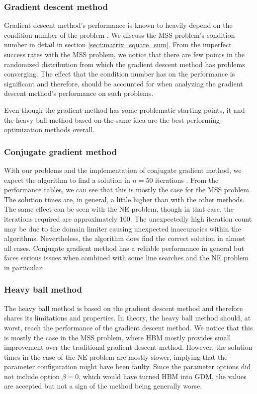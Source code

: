 \documentclass[english, 12pt, a4paper, sci, utf8, a-1b, online, table]{aaltothesis}
\begin{document}
\subsubsection*{Gradient descent method}

Gradient descent method's performance is known to heavily depend on the condition number of the problem \cite{book:introduction_continuous_optimization}. We discuss the MSS problem's condition number in detail in section \ref{sect:matrix_square_sum}. From the imperfect success rates with the MSS problem, we notice that there are few points in the randomized distribution from which the gradient descent method has problems converging. The effect that the condition number has on the performance is significant and therefore, should be accounted for when analyzing the gradient descent method's performance on such problems.

Even though the gradient method has some problematic starting points, it and the heavy ball method based on the same idea are the best performing optimization methods overall.

\subsubsection*{Conjugate gradient method}

With our problems and the implementation of conjugate gradient method, we expect the algorithm to find a solution in $n=50$ iterations \cite{book:introduction_continuous_optimization}. From the performance tables, we can see that this is mostly the case for the MSS problem. The solution times are, in general, a little higher than with the other methods. The same effect can be seen with the NE problem, though in that case, the iterations required are approximately 100. The unexpectedly high iteration count may be due to the domain limiter causing unexpected inaccuracies within the algorithms. Nevertheless, the algorithm does find the correct solution in almost all cases. Conjugate gradient method has a reliable performance in general but faces serious issues when combined with some line searches and the NE problem in particular.

\subsubsection*{Heavy ball method}

The heavy ball method is based on the gradient descent method and therefore shares its limitations and properties. In theory, the heavy ball method should, at worst, reach the performance of the gradient descent method. We notice that this is mostly the case in the MSS problem, where HBM mostly provides small improvement over the traditional gradient descent method. However, the solution times in the case of the NE problem are mostly slower, implying that the parameter configuration might have been faulty. Since the parameter options did not include option $\beta = 0$, which would have turned HBM into GDM, the values are accepted but not a sign of the method being generally worse.
\end{document}
